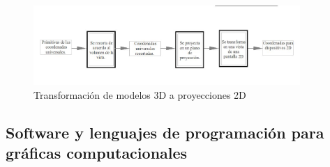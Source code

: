 \documentclass[12pt,a4paper,spanish,openany]{book}
\begin{document}
\begin{figure}
\begin{center}
\includegraphics[width=0.9\textwidth]{./img/coord2D3DB.jpg}
\caption{Transformación de modelos 3D a proyecciones 2D}
\end{center}
\end{figure}











\subsection{Software y lenguajes de programación para gráficas
computacionales}
\end{document}
